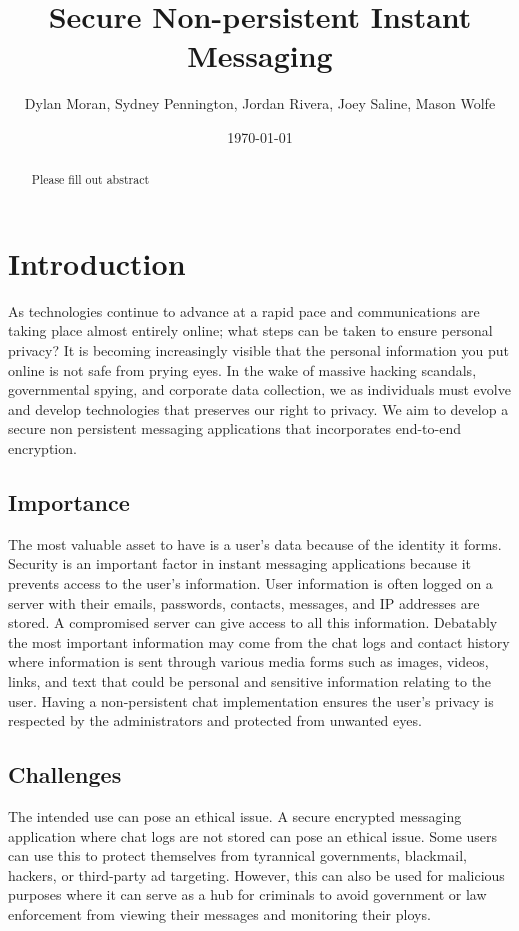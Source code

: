 \documentclass[11pt]{article}
\date{
\today
}
\theoremstyle{plain}
\theoremstyle{definition}
\begin{document}
\title{Secure Non-persistent Instant Messaging}
\author{Dylan Moran, Sydney Pennington, Jordan Rivera, Joey Saline, Mason Wolfe}
\maketitle
	
\begin{abstract}
Please fill out abstract
		
\end{abstract}


\section{Introduction}\label{sec:intro}
As technologies continue to advance at a rapid pace and communications are taking place almost entirely online; what steps can be taken to ensure personal privacy? It is becoming increasingly visible that the personal information you put online is not safe from prying eyes. In the wake of massive hacking scandals, governmental spying, and corporate data collection, we as individuals must evolve and develop technologies that preserves our right to privacy. We aim to develop a secure non persistent messaging applications that incorporates end-to-end encryption.

\subsection{Importance}\label{sec:importance}
The most valuable asset to have is a user’s data because of the identity it forms. Security is an important factor in instant messaging applications because it prevents access to the user’s information. User information is often logged on a server with their emails, passwords, contacts, messages, and IP addresses are stored. A compromised server can give access to all this information. Debatably the most important information may come from the chat logs and contact history where information is sent through various media forms such as images, videos, links, and text that could be personal and sensitive information relating to the user. Having a non-persistent chat implementation ensures the user’s privacy is respected by the administrators and protected from unwanted eyes.

\subsection{Challenges}\label{sec:challenges}
The intended use can pose an ethical issue. A secure encrypted messaging application where chat logs are not stored can pose an ethical issue. Some users can use this to protect themselves from tyrannical governments, blackmail, hackers, or third-party ad targeting. However, this can also be used for malicious purposes where it can serve as a hub for criminals to avoid government or law enforcement from viewing their messages and monitoring their ploys.
\end{document}
